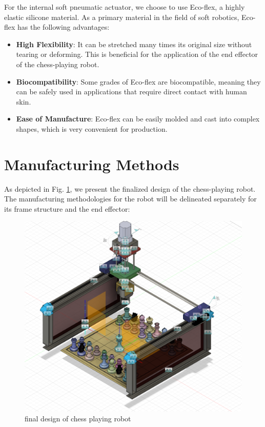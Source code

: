 \documentclass[10pt, a4paper, twocolumn]{article}
\begin{document}
For the internal soft pneumatic actuator, we choose to use Eco-flex, a highly elastic silicone material. As a primary material in the field of soft robotics, Eco-flex has the following advantages:
\begin{itemize}
    \item \textbf{High Flexibility}: It can be stretched many times its original size without tearing or deforming. This is beneficial for the application of the end effector of the chess-playing robot.
    \item \textbf{Biocompatibility}: Some grades of Eco-flex are biocompatible, meaning they can be safely used in applications that require direct contact with human skin.
    \item \textbf{Ease of Manufacture}: Eco-flex can be easily molded and cast into complex shapes, which is very convenient for production. 
\end{itemize}

\section{Manufacturing Methods}

As depicted in Fig. \ref{fig:final design}, we present the finalized design of the chess-playing robot. The manufacturing methodologies for the robot will be delineated separately for its frame structure and the end effector:

\begin{figure}
    \centering
    \includegraphics[width=0.8\linewidth]{final design.png}
    \caption{final design of chess playing robot}
    \label{fig:final design}
\end{figure}
\end{document}

